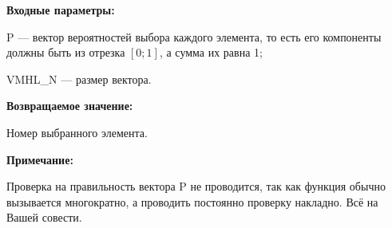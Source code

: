 \textbf{Входные параметры:}
 
 P --- вектор вероятностей выбора каждого элемента, то есть его компоненты должны быть из отрезка $[0;1]$, а сумма их равна 1;
 
 VMHL\_N --- размер вектора.

\textbf{Возвращаемое значение:} 

Номер выбранного элемента.

\textbf{Примечание:}

 Проверка на правильность вектора P не проводится, так как функция обычно вызывается многократно, а проводить постоянно проверку накладно. Всё на Вашей совести.
